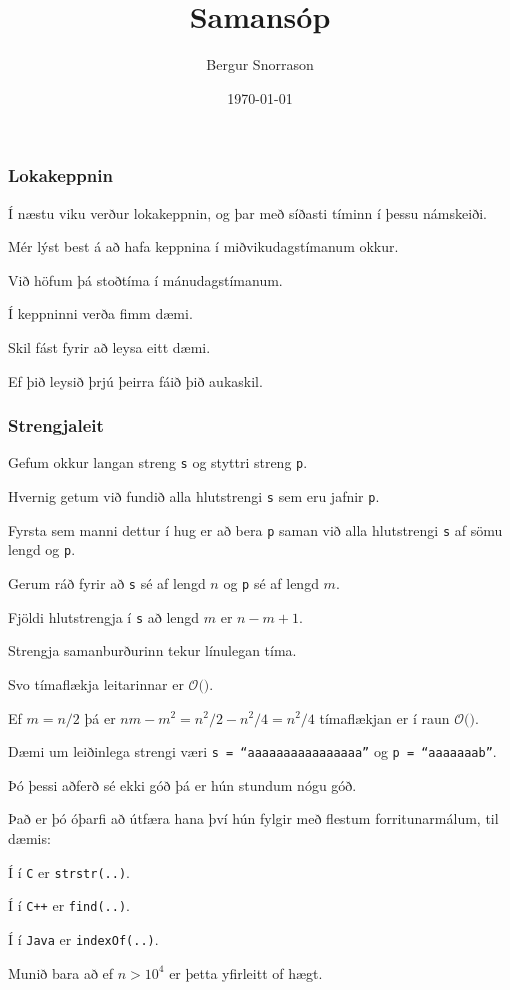 \title{Samansóp}
\author{Bergur Snorrason}
\date{\today}



\frame{\titlepage}

{
	\frametitle{Lokakeppnin}
	{
		\item<1-> Í næstu viku verður lokakeppnin, og þar með síðasti tíminn í þessu námskeiði.
		\item<2-> Mér lýst best á að hafa keppnina í miðvikudagstímanum okkur.
		\item<3-> Við höfum þá stoðtíma í mánudagstímanum.
		\item<4-> Í keppninni verða fimm dæmi.
		\item<5-> Skil fást fyrir að leysa eitt dæmi.
		\item<6-> Ef þið leysið þrjú þeirra fáið þið aukaskil.
	}
}

{
}

{
	\frametitle{Strengjaleit}
	{
		\item<1-> Gefum okkur langan streng \texttt{s} og styttri streng \texttt{p}.
		\item<2-> Hvernig getum við fundið alla hlutstrengi \texttt{s} sem eru jafnir \texttt{p}.
		\item<3-> Fyrsta sem manni dettur í hug er að bera \texttt{p} saman við alla hlutstrengi \texttt{s} af sömu lengd og \texttt{p}.
	}
}

{
}

{
	{
		\item<1-> Gerum ráð fyrir að \texttt{s} sé af lengd $n$ og \texttt{p} sé af lengd $m$.
		\item<2-> Fjöldi hlutstrengja í \texttt{s} að lengd $m$ er $n - m + 1$.
		\item<3-> Strengja samanburðurinn tekur línulegan tíma.
		\item<4-> Svo tímaflækja leitarinnar er $\mathcal{O}($\onslide<5->{$nm - m^2$}$)$.
		\item<6-> Ef $m = n/2$ þá er $nm - m^2 = n^2/2 - n^2/4 = n^2/4$ tímaflækjan er í raun $\mathcal{O}($\onslide<7->{$n^2$}$)$.
		\item<8-> Dæmi um leiðinlega strengi væri \texttt{s = ``aaaaaaaaaaaaaaaa''} og \texttt{p = ``aaaaaaab''}.
	}
}

{
	{
		\item<1-> Þó þessi aðferð sé ekki góð þá er hún stundum nógu góð.
		\item<2-> Það er þó óþarfi að útfæra hana því hún fylgir með flestum forritunarmálum, til dæmis:
		{
			\item<3-> Í  í \texttt{C} er \texttt{strstr(..)}.
			\item<4-> Í  í \texttt{C++} er \texttt{find(..)}.
			\item<5-> Í  í \texttt{Java} er \texttt{indexOf(..)}.
		}
		\item<6-> Munið bara að ef $n > 10^4$ er þetta yfirleitt of hægt.
	}
}

